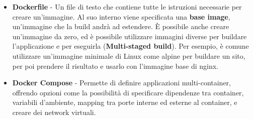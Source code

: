 \begin{itemize}
\begin{figure}[H]
      \caption{Schema sul funzionamento di Docker}
    \end{figure}
  \item \textbf{Dockerfile} - Un file di testo che contiene tutte le istruzioni necessarie per creare un'immagine. Al suo interno viene specificata una \textbf{base image},
    un'immagine che la build andr\`a ad estendere. \`E possibile anche creare un'immagine da zero, ed \`e possibile utilizzare immagini diverse per buildare l'applicazione e per eseguirla
    (\textbf{Multi-staged build}). Per esempio, \`e comune utilizzare un'immagine minimale di Linux come alpine per buildare un sito, per poi prendere il risultato e usarlo con
    l'immagine base di nginx.
  \item \textbf{Docker Compose} - Permette di definire applicazioni multi-container, offrendo opzioni come la possibilit\`a di specificare dipendenze tra container, variabili d'ambiente,
    mapping tra porte interne ed esterne al container, e creare dei network virtuali.
\end{itemize}

